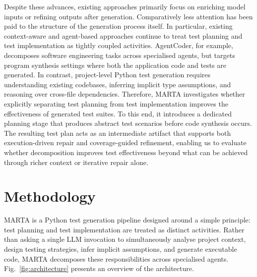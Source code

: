 \documentclass{llncs}
\begin{document}
Despite these advances, existing approaches primarily focus on enriching model inputs or refining outputs after generation. Comparatively less attention has been paid to the structure of the generation process itself. In particular, existing context-aware and agent-based approaches continue to treat test planning and test implementation as tightly coupled activities. AgentCoder, for example, decomposes software engineering tasks across specialised agents, but targets program synthesis settings where both the application code and tests are generated. In contrast, project-level Python test generation requires understanding existing codebases, inferring implicit type assumptions, and reasoning over cross-file dependencies. Therefore, MARTA investigates whether explicitly separating test planning from test implementation improves the effectiveness of generated test suites. To this end, it introduces a dedicated planning stage that produces abstract test scenarios before code synthesis occurs. The resulting test plan acts as an intermediate artifact that supports both execution-driven repair and coverage-guided refinement, enabling us to evaluate whether decomposition improves test effectiveness beyond what can be achieved through richer context or iterative repair alone.


\section{Methodology}
\label{sec:met}

MARTA is a Python test generation pipeline designed around a simple principle: test planning and test implementation are treated as distinct activities. Rather than asking a single LLM invocation to simultaneously analyse project context, design testing strategies, infer implicit assumptions, and generate executable code, MARTA decomposes these responsibilities across specialised agents. Fig.~\ref{fig:architecture} presents an overview of the architecture.
\end{document}
